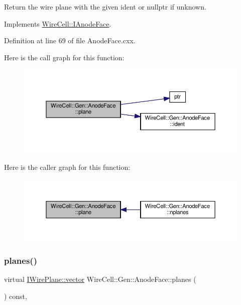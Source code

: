 Return the wire plane with the given ident or nullptr if unknown. 



Implements \hyperlink{class_wire_cell_1_1_i_anode_face_a79559335fb83389b656504e480eb2eb7}{Wire\+Cell\+::\+I\+Anode\+Face}.



Definition at line 69 of file Anode\+Face.\+cxx.

Here is the call graph for this function\+:
\nopagebreak
\begin{figure}[H]
\begin{center}
\leavevmode
\includegraphics[width=350pt]{class_wire_cell_1_1_gen_1_1_anode_face_a6ed6d7c6614695d5ace93aa10b0d2478_cgraph}
\end{center}
\end{figure}
Here is the caller graph for this function\+:
\nopagebreak
\begin{figure}[H]
\begin{center}
\leavevmode
\includegraphics[width=350pt]{class_wire_cell_1_1_gen_1_1_anode_face_a6ed6d7c6614695d5ace93aa10b0d2478_icgraph}
\end{center}
\end{figure}
\mbox{\label{class_wire_cell_1_1_gen_1_1_anode_face_abfc7fb985b42b9f5ba891a8f6986d526}} 
\subsubsection{\texorpdfstring{planes()}{planes()}}
{\footnotesize\ttfamily virtual \hyperlink{class_wire_cell_1_1_i_component_a18978d88ce697af5941655a89660fd4e}{I\+Wire\+Plane\+::vector} Wire\+Cell\+::\+Gen\+::\+Anode\+Face\+::planes (\begin{DoxyParamCaption}{ }\end{DoxyParamCaption}) const\hspace{0.3cm}{\ttfamily [inline]}, {\ttfamily [virtual]}}



